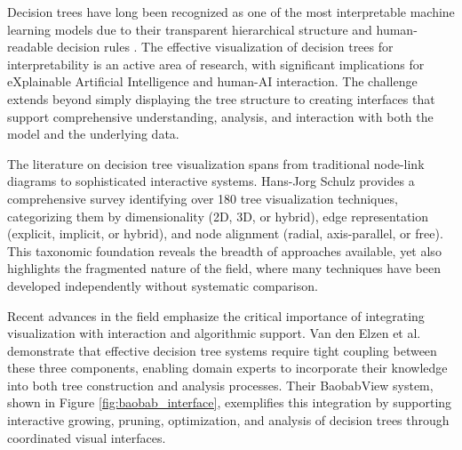 

Decision trees have long been recognized as one of the most interpretable machine learning models due to their transparent hierarchical structure and human-readable decision rules \cite{10.1145/2783258.2788613, wang2022timbertrek, lin2022generalizedscalableoptimalsparse, ustun2019learningoptimizedriskscores}. The effective visualization of decision trees for interpretability is an active area of research, with significant implications for eXplainable Artificial Intelligence and human-AI interaction. The challenge extends beyond simply displaying the tree structure to creating interfaces that support comprehensive understanding, analysis, and interaction with both the model and the underlying data.

The literature on decision tree visualization spans 
from traditional node-link diagrams to sophisticated interactive systems. Hans-Jorg Schulz \cite{schulz2011treevis} provides a comprehensive survey identifying over 180 tree visualization techniques, categorizing them by dimensionality (2D, 3D, or hybrid), edge representation (explicit, implicit, or hybrid), and node alignment (radial, axis-parallel, or free). This taxonomic foundation reveals the breadth of approaches available, yet also highlights the fragmented nature of the field, where many techniques have been developed independently without systematic comparison.

Recent advances in the field emphasize the critical importance of integrating visualization with interaction and algorithmic support. Van den Elzen et al. \cite{elzen2011baobabview} demonstrate that effective decision tree systems require tight coupling between these three components, enabling domain experts to incorporate their knowledge into both tree construction and analysis processes. Their BaobabView system, shown in Figure \ref{fig:baobab_interface}, exemplifies this integration by supporting interactive growing, pruning, optimization, and analysis of decision trees through coordinated visual interfaces.

